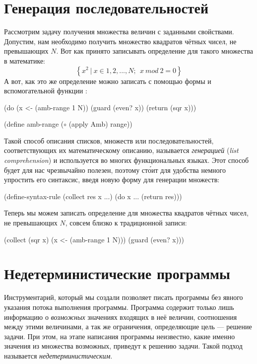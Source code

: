 \section{Генерация последовательностей}%
Рассмотрим задачу получения множества величин с заданными свойствами. Допустим, нам необходимо получить множество квадратов чётных чисел, не превышающих $N$.  Вот как принято записывать определение для такого множества в математике:  $$\left\{ x^2~|~x \in {1, 2, ..., N};~~ x~mod~2 = 0 \right\}$$
А вот, как это же определение можно записать с помощью формы  и вспомогательной функции :
\begin{SchemeCode}[emph={x,N}]
  (do (x <- (amb-range 1 N))
      (guard (even? x))
      (return (sqr x)))

  (define amb-range ($\circ$ (apply Amb) range))
\end{SchemeCode}

Такой способ описания списков, множеств или последовательностей, соответствующих их математическому описанию, называется \emph{генерацией} (\emph{list comprehension}) и используется во многих функциональных языках. Этот способ будет для нас чрезвычайно полезен, поэтому ст\'{о}ит для удобства немного упростить его синтаксис, введя новую форму  для генерации множеств:

\begin{Definition}[emph={x,res}]
(define-syntax-rule (collect res x ...)
  (do x ... (return res)))
\end{Definition}
Теперь мы можем записать определение для множества квадратов чётных чисел, не превышающих $N$, совсем близко к традиционной записи:
\begin{SchemeCode}[emph={x,N}]
  (collect (sqr x) 
           (x <- (amb-range 1 N))) 
           (guard (even? x)))
\end{SchemeCode}


\section{Недетерминистические программы}%
Инструментарий, который мы создали позволяет писать программы без явного указания потока выполнения программы. Программа содержит только лишь информацию о \emph{возможных} значениях входящих в неё величин, соотношения между этими величинами, а так же ограничения, определяющие цель --- решение задачи. При этом, на этапе написания программы неизвестно, какие именно значения из множества возможных, приведут к решению задачи. Такой подход называется \emph{недетерминистическим}.

